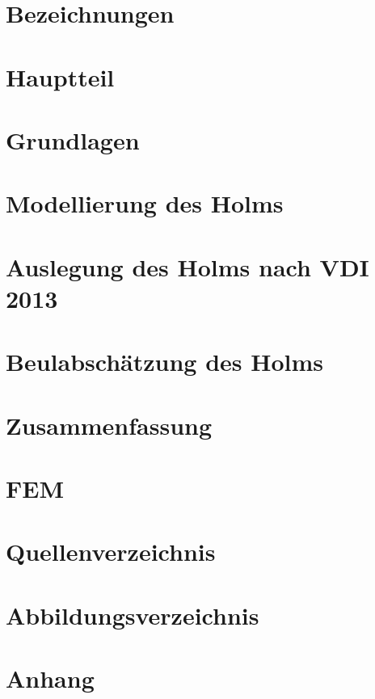 \documentclass[a4paper,twoside,11pt]{article}
\begin{document}



\tableofcontents
\section{Bezeichnungen}

\section{Hauptteil}

\section{Grundlagen}

\section{Modellierung des Holms}

\section{Auslegung des Holms nach VDI 2013}

\section{Beulabschätzung des Holms}

\section{Zusammenfassung}

\section{FEM}

\section{Quellenverzeichnis}

\section{Abbildungsverzeichnis}

\section{Anhang}

\end{document}
